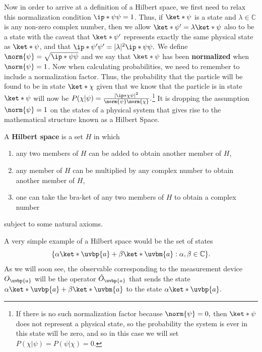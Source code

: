 \documentclass[12pt]{report}
\begin{document}
Now in order to arrive at a definition of a Hilbert space, we first need to relax this normalization condition $\ip*{\psi}{\psi}=1$. Thus, if $\ket*{\psi}$  is a state and $\lambda\in\mathbb{C}$ is any non-zero complex number, then we allow $\ket*{\psi'}=\lambda\ket*{\psi}$ also to be a state with the caveat that $\ket*{\psi'}$ represents exactly the same physical state as $\ket*{\psi}$, and that $\ip*{\psi'}{\psi'}=|\lambda|^2\ip*{\psi}{\psi}.$ We define $\norm{\psi}=\sqrt{\ip*{\psi}{\psi}}$ %
%
and we say that $\ket*{\psi}$ has been \textbf{normalized} when $\norm{\psi}=1$. Now when calculating probabilities, we need to remember to include a normalization factor. Thus, the probability that the particle will be found to be in state $\ket*{\chi}$ given that we know that the particle is in state $\ket*{\psi}$ will now be $P(\chi|\psi) = \frac{|\ip*{\chi}{\psi}|^2}{\norm{\psi}\norm{\chi}}.$\footnote{ If there is no such normalization factor because $\norm{\psi}=0,$ then $\ket*{\psi}$ does not represent a physical state, so the probability the system is ever in this state will be zero, and so in this case we will set $P(\chi|\psi)=P(\psi|\chi)=0.$} It is  dropping the assumption $\norm{\psi}=1$ on the states of a physical system that gives rise to the mathematical structure known as a Hilbert Space.   

A \textbf{Hilbert space} is a set $H$ %
%
in which 
\begin{enumerate}[noitemsep, nosep, topsep=0pt]
\item any two members of $H$ can be added to obtain another member of $H$, 
\item any member of $H$ can be multiplied by any complex number to obtain another member of $H$,
\item one can take the bra-ket of any two members of $H$ to obtain a complex number\end{enumerate}
subject to some natural axioms.\footnotemark

A very simple example of a Hilbert space would be the set of states 
$$\{\alpha\ket*{\uvbp{a}}+\beta\ket*{\uvbm{a}}:\alpha,\beta\in\mathbb{C}\}.$$ 
As we will soon see, the observable corresponding to the measurement device $O_{\uvbp{a}}$ will be the operator $\hat{O}_{\uvbp{a}}$ that sends the state $\alpha\ket*{\uvbp{a}}+\beta\ket*{\uvbm{a}}$ to the state $\alpha\ket*{\uvbp{a}}.$
\end{document}
